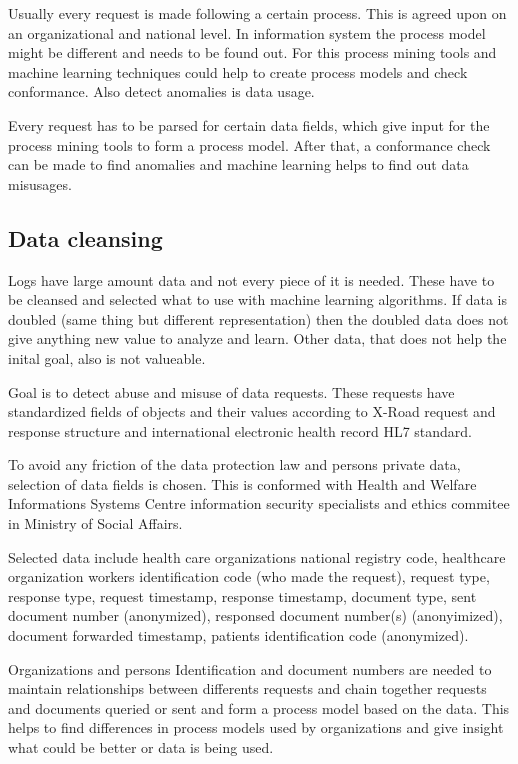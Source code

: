 \documentclass[a4paper, 12pt]{article}
\begin{document}
Usually every request is made following a certain process. This is agreed upon on an organizational and national level. In information system the process model might be different and needs to be found out. For this process mining tools and machine learning techniques could help to create process models and check conformance. Also detect anomalies is data usage. 

Every request has to be parsed for certain data fields, which give input for the process mining tools to form a process model. After that, a conformance check can be made to find anomalies and machine learning helps to find out data misusages. 

\subsection{Data cleansing}
Logs have large amount data and not every piece of it is needed. These have to be cleansed and selected what to use with machine learning algorithms. If data is doubled (same thing but different representation) then the doubled data does not give anything new value to analyze and learn. Other data, that does not help the inital goal, also is not valueable. 

Goal is to detect abuse and misuse of data requests. These requests have standardized fields of objects and their values according to X-Road request and response structure and international electronic health record HL7 standard. 

To avoid any friction of the data protection law and persons private data, selection of data fields is chosen. This is conformed with Health and Welfare Informations Systems Centre information security specialists and ethics commitee in Ministry of Social Affairs. 

Selected data include health care organizations national registry code, healthcare organization workers identification code (who made the request), request type, response type, request timestamp, response timestamp, document type, sent document number (anonymized), responsed document number(s) (anonyimized), document forwarded timestamp, patients identification code (anonymized). 

Organizations and persons Identification and document numbers are needed to maintain relationships between differents requests and chain together requests and documents queried or sent and form a process model based on the data. This helps to find differences in process models used by organizations and give insight what could be better or data is being used. 
\end{document}
